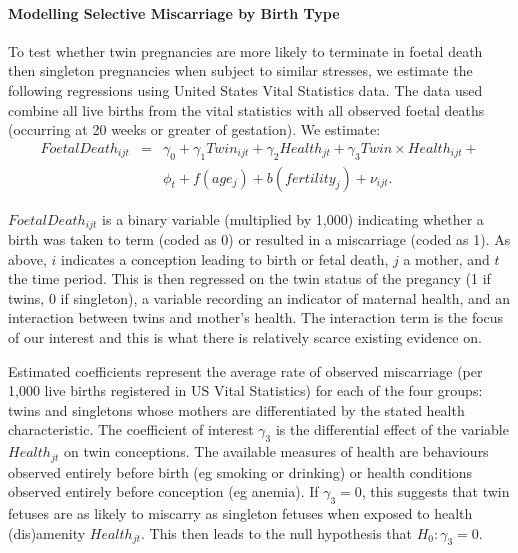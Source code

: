 \documentclass[11pt]{article}
\begin{document}
\paragraph{Modelling Selective Miscarriage by Birth Type}
To test whether twin  pregnancies are more likely to terminate in foetal death then singleton pregnancies when subject to similar stresses, we estimate the following regressions using United States Vital Statistics data.  The data used combine all live births from the vital statistics with all observed foetal deaths (occurring at 20 weeks or greater of gestation).  We estimate:
\begin{eqnarray}
  \label{eqn:FD}
  FoetalDeath_{ijt} &=& \gamma_0 + \gamma_1 Twin_{ijt} + \gamma_2 Health_{jt} + \gamma_3 Twin\times Health_{ijt} + \nonumber \\ && \phi_t + f(age_j) + b(fertility_j) + \nu_{ijt}.
\end{eqnarray}

$FoetalDeath_{ijt}$ is a binary variable (multiplied by 1,000) indicating whether a birth was taken to term (coded as 0) or resulted in a miscarriage (coded as 1).  As above, $i$ indicates a conception leading to birth or fetal death, $j$ a mother, and $t$ the time period. This is then regressed on the twin status of the pregancy (1 if twins, 0 if singleton), a variable recording an indicator of maternal health, and an interaction between twins and mother's health. The interaction term is the focus of our interest and this is what there is relatively scarce existing evidence on.

Estimated coefficients represent the average rate of observed miscarriage (per 1,000 live births registered in US Vital Statistics) for each of the four groups: twins and singletons whose mothers are differentiated by the stated health characteristic. The coefficient of interest $\gamma_3$ is the differential effect of the variable $Health_{jt}$ on twin conceptions. The available measures of health are behaviours observed entirely before birth (eg smoking or drinking) or health conditions observed entirely before conception (eg anemia). If $\gamma_3=0$, this suggests that twin fetuses are as likely to miscarry as singleton fetuses when exposed to health (dis)amenity $Health_{jt}$.  This then leads to the null hypothesis that $H_0: \gamma_3=0$.  %
\end{document}

